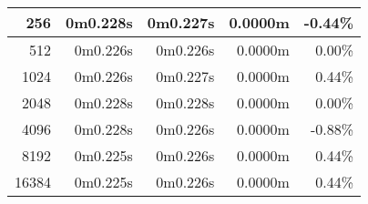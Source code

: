 \documentclass[documentation.tex]{subfiles}
\begin{document}
\begin{longtable}{|r|r|r|r|r|}
        256                                                                                                                       & 0m0.228s                        & 0m0.227s                                                                    & {\color[HTML]{FF0000} 0.0000m}                    & {\color[HTML]{FF0000} -0.44\%}                    \\ \hline
        512                                                                                                                       & 0m0.226s                        & 0m0.226s                                                                    & {\color[HTML]{32CB00} 0.0000m}                    & {\color[HTML]{32CB00} 0.00\%}                     \\ \hline
        1024                                                                                                                      & 0m0.226s                        & 0m0.227s                                                                    & {\color[HTML]{32CB00} 0.0000m}                    & {\color[HTML]{32CB00} 0.44\%}                     \\ \hline
        2048                                                                                                                      & 0m0.228s                        & 0m0.228s                                                                    & {\color[HTML]{32CB00} 0.0000m}                    & {\color[HTML]{32CB00} 0.00\%}                     \\ \hline
        4096                                                                                                                      & 0m0.228s                        & 0m0.226s                                                                    & {\color[HTML]{FF0000} 0.0000m}                    & {\color[HTML]{FF0000} -0.88\%}                    \\ \hline
        8192                                                                                                                      & 0m0.225s                        & 0m0.226s                                                                    & {\color[HTML]{32CB00} 0.0000m}                    & {\color[HTML]{32CB00} 0.44\%}                     \\ \hline
        16384                                                                                                                     & 0m0.225s                        & 0m0.226s                                                                    & {\color[HTML]{32CB00} 0.0000m}                    & {\color[HTML]{32CB00} 0.44\%}                     \\ \hline

\end{longtable}
\end{document}
